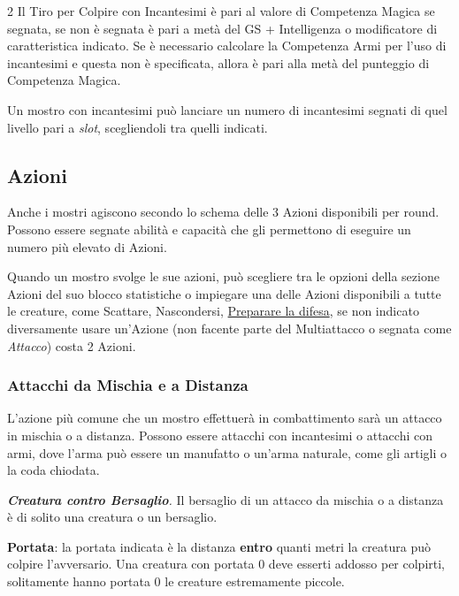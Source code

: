 \begin{multicols}{2}
Il Tiro per Colpire con Incantesimi è pari al valore di Competenza Magica se segnata, se non è segnata è  pari a metà del GS + Intelligenza o modificatore di caratteristica indicato. Se è necessario calcolare la Competenza Armi per l'uso di incantesimi e questa non è specificata, allora è pari alla metà del punteggio di Competenza Magica.

Un mostro con incantesimi può lanciare un numero di incantesimi segnati di quel livello pari a \emph{slot}, scegliendoli tra quelli indicati.




\subsection{Azioni}

Anche i mostri agiscono secondo lo schema delle 3 Azioni disponibili per round. Possono essere segnate abilità e capacità che gli permettono di eseguire un numero più elevato di Azioni.

Quando un mostro svolge le sue azioni, può scegliere tra le opzioni della sezione Azioni del suo blocco statistiche o impiegare una delle Azioni disponibili a tutte le creature, come Scattare, Nascondersi, \hyperlink{preparareladifesa}{Preparare la difesa}, se non indicato diversamente usare un'Azione (non facente parte del Multiattacco o segnata come \emph{Attacco}) costa 2 Azioni.

\subsubsection{Attacchi da Mischia e a Distanza}

L'azione più comune che un mostro effettuerà in combattimento sarà un attacco in mischia o a distanza. Possono essere attacchi con incantesimi o attacchi con armi, dove l'arma può essere un manufatto o un'arma naturale, come gli artigli o la coda chiodata.

\emph{\textbf{Creatura contro Bersaglio}.} Il bersaglio di un attacco da mischia o a distanza è di solito una creatura o un bersaglio.

\textbf{Portata}: la portata indicata è la distanza \textbf{entro} quanti metri la creatura può colpire l'avversario. Una creatura con portata 0 deve esserti addosso per colpirti, solitamente hanno portata 0 le creature estremamente piccole.


\end{multicols}
